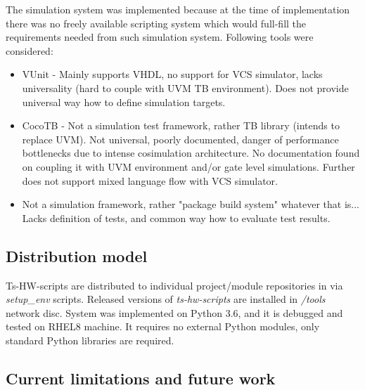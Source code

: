 \documentclass{tropic_design_spec}
\begin{document}
The simulation system was implemented because at the time of implementation there
was no freely available scripting system which would full-fill the requirements
needed from such simulation system. Following tools were considered:
\begin{itemize}
    \item{VUnit - Mainly supports VHDL, no support for VCS simulator, lacks
          universality (hard to couple with UVM TB environment). Does not
          provide universal way how to define simulation targets.}
    \item{CocoTB - Not a simulation test framework, rather TB library
          (intends to replace UVM). Not universal, poorly documented, danger
          of performance bottlenecks due to intense cosimulation architecture.
          No documentation found on coupling it with UVM environment and/or
          gate level simulations. Further does not support mixed language
          flow with VCS simulator.}
    \item{Not a simulation framework, rather "package build system" whatever
          that is... Lacks definition of tests, and common way how to evaluate
          test results.}

\end{itemize}


\subsection*{Distribution model}

Ts-HW-scripts are distributed to individual project/module repositories in
via \textit{setup_env} scripts. Released versions of \textit{ts-hw-scripts}
are installed in \textit{/tools} network disc. System was implemented on Python
3.6, and it is debugged and tested on RHEL8 machine. It requires no external
Python modules, only standard Python libraries are required.


\subsection*{Current limitations and future work}


\end{document}
